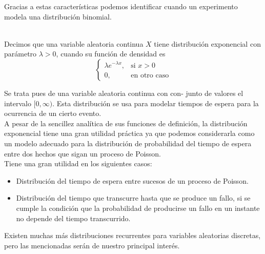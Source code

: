 Gracias a estas características podemos identificar cuando un experimento modela una distribución binomial.\\\\
\begin{Def}
    Decimos que una variable aleatoria continua $X$ tiene distribución exponencial con parámetro $\lambda>0$, cuando su función de densidad es
    $$\begin{cases}
        \lambda e^{-\lambda x}, & \mbox{si $x>0$}\\
        0, & \mbox{en otro caso}
    \end{cases}
    $$
\end{Def}
Se trata pues de una variable aleatoria continua con con-
junto de valores el intervalo $[0,\infty)$. Esta distribución se usa para modelar tiempos de espera para la ocurrencia de un cierto evento.\\
A pesar de la sencillez analítica de sus funciones de definición, la distribución exponencial tiene una gran utilidad práctica ya que podemos considerarla como un modelo adecuado para la distribución de probabilidad del tiempo de espera entre dos hechos que sigan un proceso de Poisson.\\
Tiene una gran utilidad en los siguientes casos:
\begin{itemize}
    \item Distribución del tiempo de espera entre sucesos de un proceso de Poisson.
    \item Distribución del tiempo que transcurre hasta que se produce un fallo, si se cumple la condición que la probabilidad de producirse un fallo en un instante no depende del tiempo transcurrido.
\end{itemize}
Existen muchas más distribuciones recurrentes para variables aleatorias discretas, pero las mencionadas serán de nuestro principal interés.